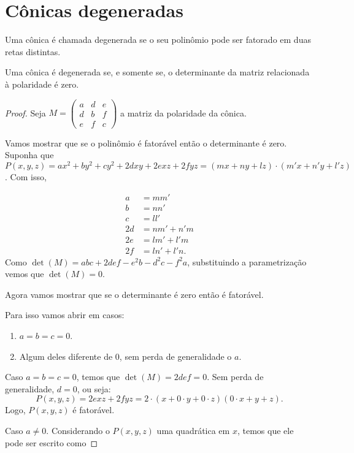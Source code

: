 \section{Cônicas degeneradas}
\begin{defn}
Uma cônica é chamada degenerada se o seu polinômio pode ser fatorado em duas retas distintas.
\end{defn}

\begin{thm}
Uma cônica é degenerada se, e somente se, o determinante da matriz relacionada à polaridade é zero.
\end{thm}
\begin{proof}
Seja $M = \begin{pmatrix} a& d& e \\ d& b& f \\ e& f& c\end{pmatrix}$ a matriz da polaridade da cônica.

Vamos mostrar que se o polinômio é fatorável então o determinante é zero.
Suponha que $P(x,y,z) = ax^2+by^2+cy^2+2dxy+2exz+2fyz = (mx+ny+lz)\cdot(m'x+n'y+l'z)$. Com isso,

\begin{align*}
    a &= mm' \\
    b &= nn' \\
    c &= ll'\\
    2d &= nm'+n'm\\
    2e &= lm'+l'm\\
    2f &=ln'+l'n.
\end{align*}
Como $\det(M) = abc + 2def -e^2b-d^2c-f^2a$, substituindo a parametrização vemos que $\det(M) = 0$.

Agora vamos mostrar que se o determinante é zero então é fatorável.

Para isso vamos abrir em casos:
\begin{enumerate}
    \item $a=b=c=0$.
    \item Algum deles diferente de 0, sem perda de generalidade o $a$.
\end{enumerate}

Caso $a=b=c=0$, temos que $\det(M) = 2def = 0$. Sem perda de generalidade, $d=0$, ou seja:
\[ P(x,y,z) = 2exz+2fyz = 2\cdot(x+0\cdot y + 0 \cdot z)(0\cdot x + y + z).\]
Logo, $P(x,y,z)$ é fatorável.

Caso $a \ne 0$.
Considerando o $P(x,y,z)$ uma quadrática em $x$, temos que ele pode ser escrito como


\end{proof}
